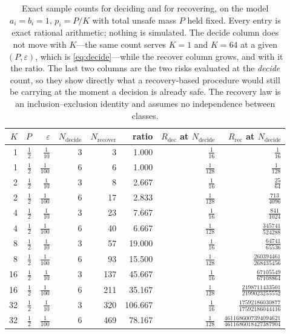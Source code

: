 \begin{table}[t]
\caption{Exact sample counts for deciding and for recovering, on the model
$a_{i}=b_{i}=1$, $p_{i}=P/K$ with total unsafe mass $P$ held fixed. Every entry is exact
rational arithmetic; nothing is simulated. The decide column does not move with $K$---the
same count serves $K=1$ and $K=64$ at a given $(P,\varepsilon)$, which is
\eqref{eq:decide}---while the recover column grows, and with it the ratio. The last two
columns are the two risks evaluated at the \emph{decide} count, so they show directly what a
recovery-based procedure would still be carrying at the moment a decision is already safe.
The recovery law is an inclusion--exclusion identity and assumes no independence between
classes.}
\label{tab:separation}
\centering
\footnotesize
\setlength{\tabcolsep}{6pt}
\begin{tabular}{@{}rrrrrrrr@{}}
\toprule
$K$ & $P$ & $\varepsilon$ & $N_{\mathrm{decide}}$ & $N_{\mathrm{recover}}$ &
ratio & $R_{\mathrm{dec}}$ at $N_{\mathrm{decide}}$ & $R_{\mathrm{rec}}$ at $N_{\mathrm{decide}}$ \\
\midrule
1 & $\frac{1}{2}$ & $\frac{1}{10}$ & 3 & 3 & 1.000 & $\frac{1}{16}$ & $\frac{1}{16}$ \\
1 & $\frac{1}{2}$ & $\frac{1}{100}$ & 6 & 6 & 1.000 & $\frac{1}{128}$ & $\frac{1}{128}$ \\
2 & $\frac{1}{2}$ & $\frac{1}{10}$ & 3 & 8 & 2.667 & $\frac{1}{16}$ & $\frac{25}{64}$ \\
2 & $\frac{1}{2}$ & $\frac{1}{100}$ & 6 & 17 & 2.833 & $\frac{1}{128}$ & $\frac{713}{4096}$ \\
4 & $\frac{1}{2}$ & $\frac{1}{10}$ & 3 & 23 & 7.667 & $\frac{1}{16}$ & $\frac{841}{1024}$ \\
4 & $\frac{1}{2}$ & $\frac{1}{100}$ & 6 & 40 & 6.667 & $\frac{1}{128}$ & $\frac{345741}{524288}$ \\
8 & $\frac{1}{2}$ & $\frac{1}{10}$ & 3 & 57 & 19.000 & $\frac{1}{16}$ & $\frac{64741}{65536}$ \\
8 & $\frac{1}{2}$ & $\frac{1}{100}$ & 6 & 93 & 15.500 & $\frac{1}{128}$ & $\frac{260394461}{268435456}$ \\
16 & $\frac{1}{2}$ & $\frac{1}{10}$ & 3 & 137 & 45.667 & $\frac{1}{16}$ & $\frac{67105549}{67108864}$ \\
16 & $\frac{1}{2}$ & $\frac{1}{100}$ & 6 & 211 & 35.167 & $\frac{1}{128}$ & $\frac{2198711433501}{2199023255552}$ \\
32 & $\frac{1}{2}$ & $\frac{1}{10}$ & 3 & 320 & 106.667 & $\frac{1}{16}$ & $\frac{17592186030877}{17592186044416}$ \\
32 & $\frac{1}{2}$ & $\frac{1}{100}$ & 6 & 469 & 78.167 & $\frac{1}{128}$ & $\frac{4611686007394094621}{4611686018427387904}$ \\
\bottomrule
\end{tabular}
\end{table}
